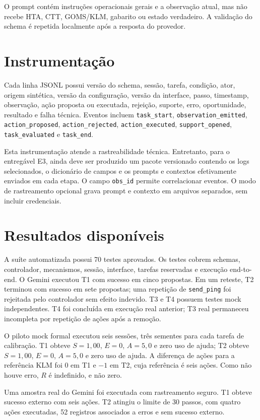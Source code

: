 \documentclass[conference]{IEEEtran}
\begin{document}
O prompt contém instruções operacionais gerais e a observação atual, mas não
recebe HTA, CTT, GOMS/KLM, gabarito ou estado verdadeiro. A validação do schema
é repetida localmente após a resposta do provedor.

\section{Instrumentação}
Cada linha JSONL possui versão do schema, sessão, tarefa, condição, ator,
origem sintética, versão da configuração, versão da interface, passo,
timestamp, observação, ação proposta ou executada, rejeição, suporte, erro,
oportunidade, resultado e falha técnica. Eventos incluem
\texttt{task\_start}, \texttt{observation\_emitted},
\texttt{action\_proposed}, \texttt{action\_rejected},
\texttt{action\_executed}, \texttt{support\_opened},
\texttt{task\_evaluated} e \texttt{task\_end}.

Esta instrumentação atende a rastreabilidade técnica. Entretanto, para o
entregável E3, ainda deve ser produzido um pacote versionado contendo os logs
selecionados, o dicionário de campos e os prompts e contextos efetivamente
enviados em cada etapa. O campo \texttt{obs\_id} permite correlacionar eventos.
O modo de rastreamento opcional grava prompt e contexto em arquivos separados,
sem incluir credenciais.

\section{Resultados disponíveis}
A suíte automatizada possui 70 testes aprovados. Os testes cobrem schemas,
controlador, mecanismos, sessão, interface, tarefas reservadas e execução
end-to-end. O Gemini executou T1 com sucesso em cinco propostas. Em um reteste,
T2 terminou com sucesso em sete propostas; uma repetição de
\texttt{send\_ping} foi rejeitada pelo controlador sem efeito indevido.
T3 e T4 possuem testes mock independentes. T4 foi concluída em execução real
anterior; T3 real permaneceu incompleta por repetição de ações após a remoção.

O piloto mock formal executou seis sessões, três sementes para cada tarefa de
calibração. T1 obteve \(S=1{,}00\), \(E=0\), \(A=5{,}0\) e zero uso de ajuda;
T2 obteve \(S=1{,}00\), \(E=0\), \(A=5{,}0\) e zero uso de ajuda. A diferença
de ações para a referência KLM foi \(0\) em T1 e \(-1\) em T2, cuja referência
é seis ações. Como não houve erro, \(R\) é indefinido, e não zero.

Uma amostra real do Gemini foi executada com rastreamento seguro. T1 obteve
sucesso externo com seis ações. T2 atingiu o limite de 30 passos, com quatro
ações executadas, 52 registros associados a erros e sem sucesso externo.
\end{document}

